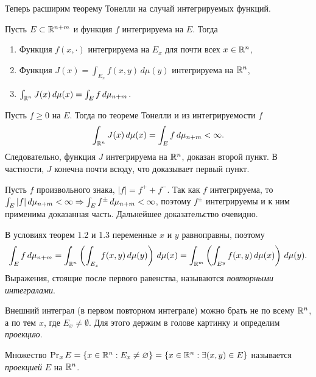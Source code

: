\vspace{5pt}
Теперь расширим теорему Тонелли на случай интегрируемых функций.

\begin{theorem}
	Пусть $E \subset \mathbb{R}^{n+m}$ и функция $f$ интегрируема на $E$. Тогда 
	\begin{enumerate}[itemsep = 0pt, topsep = 5pt]
		\item Функция $f(x, \cdot)$ интегрируема на $E_x$ для почти всех $x \in \mathbb{R}^n$, 
		\item Функция $J(x) = \int_{E_x} f(x, y) \, d\mu(y)$ интегрируема на $\mathbb{R}^n$, 
		\item $\int_{\mathbb{R}^n} J(x) \, d\mu(x) = \int_{E} f \, d\mu_{n+m}$.
	\end{enumerate}
\end{theorem}

\begin{myproof}
	Пусть $f \geq 0$ на $E$. Тогда по теореме Тонелли и из интегрируемости $f$
	\[ \int_{\mathbb{R}^n} J(x) \, d\mu(x) = \int_{E} f \, d\mu_{n+m} < \infty. \]
	Следовательно, функция $J$ интегрируема на $\mathbb{R}^n$, доказан второй пункт. В частности, $J$ конечна почти всюду, что доказывает первый пункт.  

	\vspace{5pt}
	Пусть $f$ произвольного знака, $|f| = f^+ + f^-$. Так как $f$ интегрируема, то $\int_{E} |f| \, d\mu_{n+m} < \infty \Rightarrow \int_{E} f^{\pm} \, d\mu_{n+m} < \infty$, поэтому $f^{\pm}$ интегрируемы и к ним применима доказанная часть.
    Дальнейшее доказательство очевидно.
\end{myproof}

\begin{note}
	В условиях теорем 1.2 и 1.3 переменные $x$ и $y$ равноправны, поэтому 
	\[ \int_{E} f \, d\mu_{n+m} = \int_{\mathbb{R}^n} \left( \int_{E_x} f(x, y) \, d\mu(y) \right) \, d\mu(x) = \int_{\mathbb{R}^m} \left( \int_{E^y} f(x, y) \, d\mu(x) \right) \, d\mu(y). \]
	Выражения, стоящие после первого равенства, называются \textit{повторными интегралами}.
\end{note}

Внешний интеграл (в первом повторном интеграле) можно брать не по всему $\mathbb{R}^n$, а по тем $x$, где $E_x \neq \emptyset$.
Для этого держим в голове картинку и определим \textit{проекцию}.

\begin{definition}
	Множество $\operatorname{Pr}_x E = \{x \in \mathbb{R}^n : E_x \neq \varnothing\} = \{x \in \mathbb{R}^n : \exists (x, y) \in E\}$ называется \textit{проекцией} $E$ на $\mathbb{R}^n$.
\end{definition}

